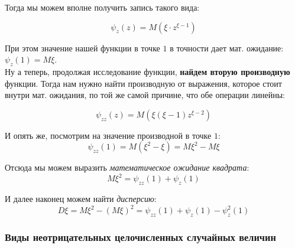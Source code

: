 \documentclass{article}
\begin{document}
Тогда мы можем вполне получить запись такого вида:

$$\psi_z(z) = M(\xi\cdot z^{\xi - 1})$$

При этом значение нашей функции в точке $1$ в точности дает мат. ожидание: $\boxed{\psi_z(1) = M\xi}$.
\\

Ну а теперь, продолжая исследование функции, \textbf{найдем вторую производную} функции. Тогда нам нужно найти производную от выражения, которое стоит внутри мат. ожидания, по той же самой причине, что обе операции линейны:

$$\psi_{zz}(z) = M(\xi(\xi - 1)z^{\xi - 2})$$

И опять же, посмотрим на значение производной в точке $1$:
$$\psi_{zz}(1) = M(\xi^2 - \xi) = M\xi^2 - M\xi$$

Отсюда мы можем выразить \textit{математическое ожидание квадрата}:
$$M\xi^2 = \psi_{zz}(1) + \psi_z(1)$$

И далее наконец можем найти \textit{дисперсию}:
$$\boxed{D\xi} = M\xi^2 - (M\xi)^2 = \boxed{\psi_{zz}(1) + \psi_z(1) - \psi_z^2(1)}$$

\subsubsection{Виды неотрицательных целочисленных случайных величин}
\end{document}

